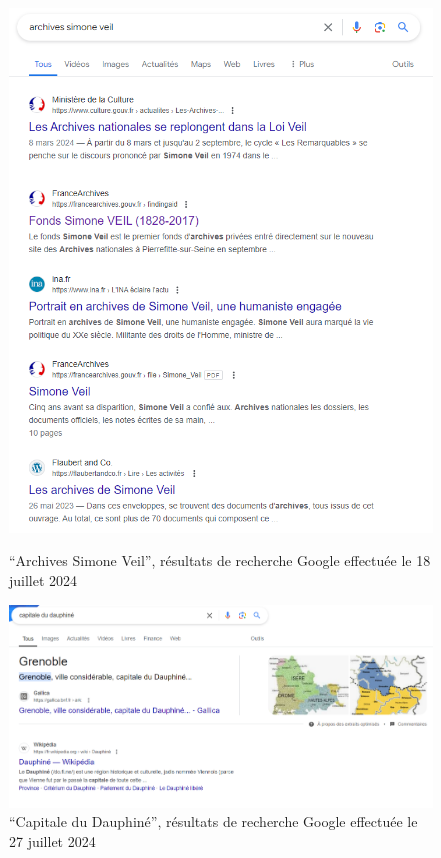 \begin{figure}[h!]
	\centering
	\begin{minipage}[b]{0.45\textwidth}
		\centering
		\includegraphics[width=\textwidth]{images/image6.png}
		\caption{\enquote{Archives Simone Veil}, résultats de recherche Google effectuée le 18 juillet 2024}
		\label{fig:image6}
	\end{minipage}
	\hspace{0.05\textwidth} %
	\begin{minipage}[b]{0.45\textwidth}
		\centering
		\includegraphics[width=\textwidth]{images/image7.png}
		\caption{\enquote{Capitale du Dauphiné}, résultats de recherche Google effectuée le 27 juillet 2024}
		\label{fig:image7}
	\end{minipage}
\end{figure}


